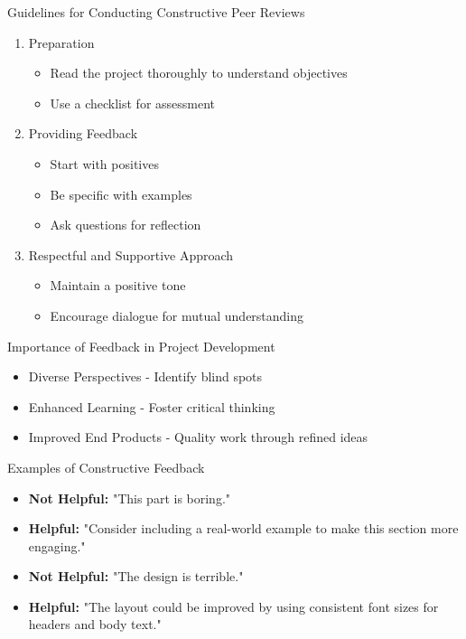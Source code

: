 \documentclass[aspectratio=169]{beamer}
\begin{document}
\begin{frame}[fragile]{Guidelines for Conducting Constructive Peer Reviews}
    \begin{enumerate}
        \item Preparation
        \begin{itemize}
            \item Read the project thoroughly to understand objectives
            \item Use a checklist for assessment
        \end{itemize}
        \item Providing Feedback
        \begin{itemize}
            \item Start with positives
            \item Be specific with examples
            \item Ask questions for reflection
        \end{itemize}
        \item Respectful and Supportive Approach
        \begin{itemize}
            \item Maintain a positive tone
            \item Encourage dialogue for mutual understanding
        \end{itemize}
    \end{enumerate}
\end{frame}

\begin{frame}[fragile]{Importance of Feedback in Project Development}
    \begin{itemize}
        \item Diverse Perspectives - Identify blind spots
        \item Enhanced Learning - Foster critical thinking
        \item Improved End Products - Quality work through refined ideas
    \end{itemize}
\end{frame}

\begin{frame}[fragile]{Examples of Constructive Feedback}
    \begin{itemize}
        \item \textbf{Not Helpful:} "This part is boring."
        \item \textbf{Helpful:} "Consider including a real-world example to make this section more engaging."
        \item \textbf{Not Helpful:} "The design is terrible."
        \item \textbf{Helpful:} "The layout could be improved by using consistent font sizes for headers and body text."
    \end{itemize}
\end{frame}
\end{document}

